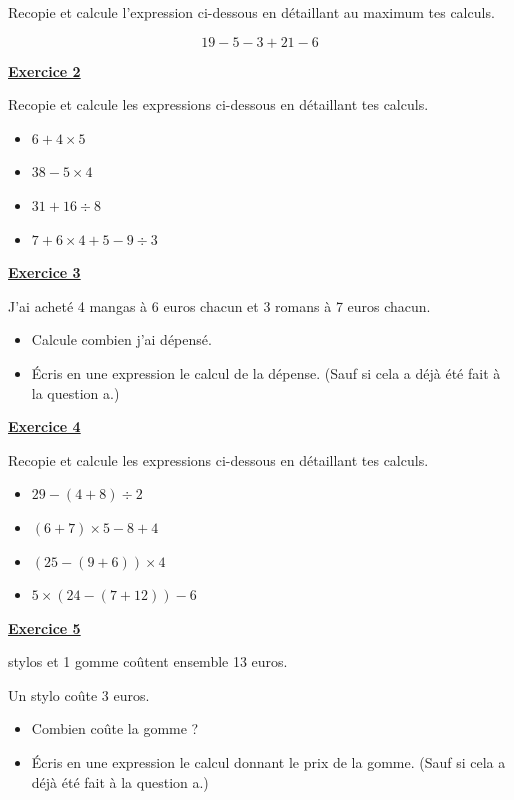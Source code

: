 \documentclass[13pt]{extarticle}
\newcommand{\exo}[1]{%
  \vspace{0.8em}%
  \noindent\large\underline{\textbf{Exercice #1}}%
  \vspace{0.2em}\par%
}
\begin{document}
\noindent Recopie et calcule l'expression ci-dessous en détaillant au maximum tes calculs.

\[
19 - 5 - 3 + 21 - 6
\]

\exo{2}

\noindent Recopie et calcule les expressions ci-dessous en détaillant tes calculs.

\begin{itemize}
  \item[a)] $6 + 4 \times 5$
  \item[b)] $38 - 5 \times 4$
  \item[c)] $31 + 16 \div 8$
  \item[d)] $7 + 6 \times 4 + 5 - 9 \div 3$
\end{itemize}

\exo{3}

\noindent J'ai acheté 4 mangas à 6 euros chacun et 3 romans à 7 euros chacun.

\begin{itemize}
  \item[a)] Calcule combien j'ai dépensé.
  \item[b)] Écris en une expression le calcul de la dépense. (Sauf si cela a déjà été fait à la question a.)
\end{itemize}

\exo{4}

\noindent Recopie et calcule les expressions ci-dessous en détaillant tes calculs.

\begin{itemize}
  \item[a)] $29 - (4 + 8) \div 2$
  \item[b)] $(6 + 7) \times 5 - 8 + 4$
  \item[c)] $(25 - (9 + 6)) \times 4$
  \item[d)] $5 \times (24 - (7 + 12)) - 6$
\end{itemize}

\newpage

\exo{5}

 stylos et 1 gomme coûtent ensemble 13 euros.

\noindent Un stylo coûte 3 euros.

\begin{itemize}
  \item[a)] Combien coûte la gomme ?
  \item[b)] Écris en une expression le calcul donnant le prix de la gomme. (Sauf si cela a déjà été fait à la question a.)
\end{itemize}
\end{document}
